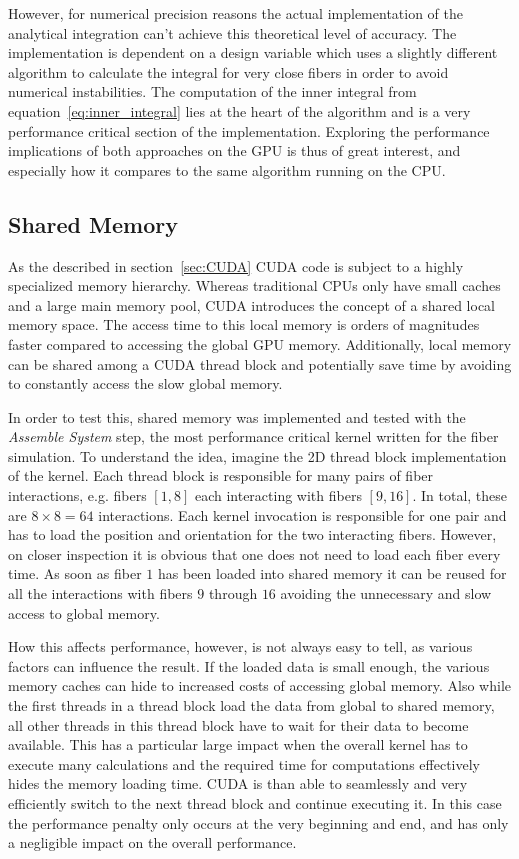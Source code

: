 \documentclass[a4paper,11pt]{kth-mag}
\begin{document}
However, for numerical precision reasons the actual implementation of the analytical integration can't achieve this theoretical level of accuracy. The implementation is dependent on a design variable which uses a slightly different algorithm to calculate the integral for very close fibers in order to avoid numerical instabilities. The computation of the inner integral from equation~\eqref{eq:inner_integral} lies at the heart of the algorithm and is a very performance critical section of the implementation. Exploring the performance implications of both approaches on the GPU is thus of great interest, and especially how it compares to the same algorithm running on the CPU.

\subsection{Shared Memory}
\label{subsec:shared_memory}

As the described in section~\ref{sec:CUDA} CUDA code is subject to a highly specialized memory hierarchy. Whereas traditional CPUs only have small caches and a large main memory pool, CUDA introduces the concept of a shared local memory space. The access time to this local memory is orders of magnitudes faster compared to accessing the global GPU memory. Additionally, local memory can be shared among a CUDA thread block and potentially save time by avoiding to constantly access the slow global memory.

In order to test this, shared memory was implemented and tested with the \emph{Assemble System} step, the most performance critical kernel written for the fiber simulation. To understand the idea, imagine the 2D thread block implementation of the kernel. Each thread block is responsible for many pairs of fiber interactions, e.g. fibers $[1,8]$ each interacting with fibers $[9,16]$. In total, these are $8 \times 8 = 64$ interactions. Each kernel invocation is responsible for one pair and has to load the position and orientation for the two interacting fibers. However, on closer inspection it is obvious that one does not need to load each fiber every time. As soon as fiber $1$ has been loaded into shared memory it can be reused for all the interactions with fibers $9$ through $16$ avoiding the unnecessary and slow access to global memory.

How this affects performance, however, is not always easy to tell, as various factors can influence the result. If the loaded data is small enough, the various memory caches can hide to increased costs of accessing global memory. Also while the first threads in a thread block load the data from global to shared memory, all other threads in this thread block have to wait for their data to become available. This has a particular large impact when the overall kernel has to execute many calculations and the required time for computations effectively hides the memory loading time. CUDA is than able to seamlessly and very efficiently switch to the next thread block and continue executing it. In this case the performance penalty only occurs at the very beginning and end, and has only a negligible impact on the overall performance.
\end{document}

